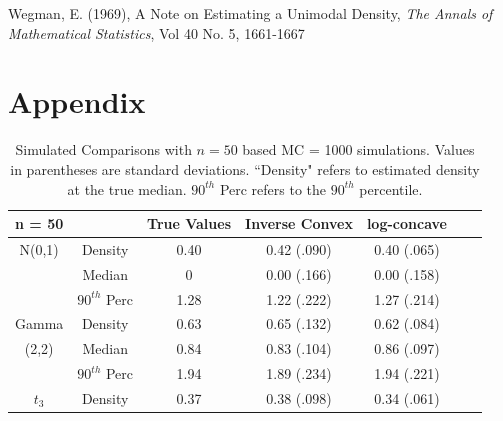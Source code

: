 \documentclass[11pt]{article}
\numberwithin{equation}{section}
\begin{document}
\vspace{3mm}

Wegman, E. (1969), A Note on Estimating a Unimodal Density, \emph{The Annals of Mathematical Statistics}, Vol 40 No. 5, 1661-1667

\vspace{3mm}



{\section{Appendix}	}


		\begin{table}

\begin{center}	
\caption[Simulated Comparisons for Inverse Convex and Log-concave Estimators with $n = 50$]{Simulated Comparisons with $n = 50$ based MC = 1000 simulations. Values in parentheses are standard deviations. ``Density" refers to estimated density at the true median. $90^{th}$ Perc refers to the $90^{th}$ percentile.}

\begin{tabular} {| c | c | c | c | c | c | c |} 


	 \hline
	 
	 n = 50 		& 			&	True Values	& Inverse Convex		&	log-concave	\\
	 
	 \hline
	 
	N(0,1) 		& Density		& 	0.40			& 	0.42 (.090)		&	0.40 (.065)	\\
	 
	 
		 		& Median 		&	0			& 	0.00 (.166)		&	0.00 (.158)	  \\ 
					
				& $90^{th}$ Perc&	1.28			& 	1.22 (.222)		&	1.27 (.214)	\\
	
	\hline

	 
	 Gamma	 	& Density		& 	0.63			& 	0.65 (.132)		&	0.62 (.084)	\\
	 
	 
	 (2,2)			& Median 		&	0.84			& 	0.83 (.104)		& 	0.86 (.097)	 \\ 
				
				& $90^{th}$ Perc&	1.94			& 	1.89 (.234)		&	1.94 (.221)	 \\
	
	\hline
		
	 
	 $t_3$	 	& Density		& 	0.37			& 	0.38 (.098)		&	0.34 (.061)	\\
	 

\end{tabular}
\end{center}
\end{table}
\end{document}
